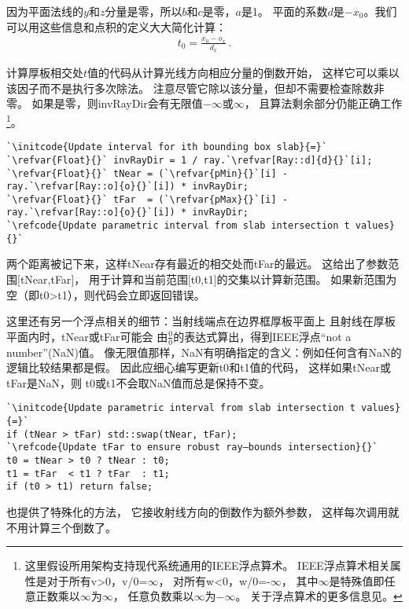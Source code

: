 因为平面法线的$y$和$z$分量是零，所以$b$和$c$是零，$a$是1。
平面的系数$d$是$-x_0$。我们可以用这些信息和点积的定义大大简化计算：
\begin{align*}
    t_0=\frac{x_0-o_x}{d_x}\, .
\end{align*}

计算厚板相交处$t$值的代码从计算光线方向相应分量的倒数开始，
这样它可以乘以该因子而不是执行多次除法。
注意尽管它除以该分量，但却不需要检查除数非零。
如果是零，则{\ttfamily invRayDir}会有无限值$-\infty$或$\infty$，
且算法剩余部分仍能正确工作
\footnote{这里假设所用架构支持现代系统通用的IEEE浮点算术。
IEEE浮点算术相关属性是对于所有{\ttfamily v>0}，{\ttfamily v/0=}$\infty$，
对所有{\ttfamily w<0}，{\ttfamily w/0=-}$\infty$，
其中$\infty$是特殊值即任意正数乘以$\infty$为$\infty$，
任意负数乘以$\infty$为$-\infty$。
关于浮点算术的更多信息见\protect{}。}。
\begin{lstlisting}
`\initcode{Update interval for ith bounding box slab}{=}`
`\refvar{Float}{}` invRayDir = 1 / ray.`\refvar[Ray::d]{d}{}`[i];
`\refvar{Float}{}` tNear = (`\refvar{pMin}{}`[i] - ray.`\refvar[Ray::o]{o}{}`[i]) * invRayDir;
`\refvar{Float}{}` tFar  = (`\refvar{pMax}{}`[i] - ray.`\refvar[Ray::o]{o}{}`[i]) * invRayDir;
`\refcode{Update parametric interval from slab intersection t values}{}`
\end{lstlisting}

两个距离被记下来，这样{\ttfamily tNear}存有最近的相交处而{\ttfamily tFar}的最远。
这给出了参数范围$[${\ttfamily tNear,tFar}$]$，
用于计算和当前范围$[${\ttfamily t0,t1}$]$的交集以计算新范围。
如果新范围为空（即{\ttfamily t0>t1}），则代码会立即返回错误。

这里还有另一个浮点相关的细节：当射线端点在边界框厚板平面上
且射线在厚板平面内时，{\ttfamily tNear}或{\ttfamily tFar}可能会
由$\frac{0}{0}$的表达式算出，得到IEEE浮点“not a number”(NaN)值。
像无限值那样，NaN有明确指定的含义：例如任何含有NaN的逻辑比较结果都是假。
因此应细心编写更新{\ttfamily t0}和{\ttfamily t1}值的代码，
这样如果{\ttfamily tNear}或{\ttfamily tFar}是NaN，则
{\ttfamily t0}或{\ttfamily t1}不会取NaN值而总是保持不变。
\begin{lstlisting}
`\initcode{Update parametric interval from slab intersection t values}{=}`
if (tNear > tFar) std::swap(tNear, tFar);
`\refcode{Update tFar to ensure robust ray–bounds intersection}{}`
t0 = tNear > t0 ? tNear : t0;
t1 = tFar  < t1 ? tFar  : t1;
if (t0 > t1) return false;
\end{lstlisting}

也提供了特殊化的方法，
它接收射线方向的倒数作为额外参数，
这样每次调用就不用计算三个倒数了。

